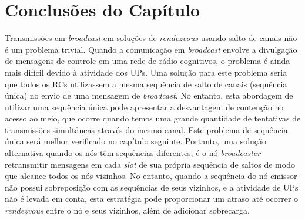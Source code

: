{%

\section{Conclusões do Capítulo}
\label{sec:conclusoes_cap_broadcast}


Transmissões em {\it broadcast} em soluções de {\it rendezvous} usando salto de canais não é um problema trivial. Quando a comunicação em {\it broadcast} envolve a divulgação de mensagens de controle em uma rede de rádio cognitivos, o problema é ainda mais difícil devido à atividade dos UPs. Uma solução para este problema seria que todos os RCs utilizassem a mesma sequência de salto de canais (sequência única) no envio de uma mensagem de {\it broadcast}. No entanto, esta abordagem de utilizar uma sequência única pode apresentar a desvantagem de contenção no acesso ao meio, que ocorre quando temos uma grande quantidade de tentativas de transmissões simultâneas através do mesmo canal. Este problema de sequência única será melhor verificado no capítulo seguinte. Portanto, uma solução alternativa quando os nós têm sequências diferentes, é o nó {\it broadcaster} retransmitir mensagens em cada {\it slot} de sua própria sequência de saltos de modo que alcance todos os nós vizinhos. No entanto, quando a sequência do nó emissor não possui sobreposição com as sequências de seus vizinhos, e a atividade de UPs não é levada em conta, esta estratégia pode proporcionar um atraso até ocorrer o {\it rendezvous} entre o nó e seus vizinhos, além de adicionar sobrecarga.

}
